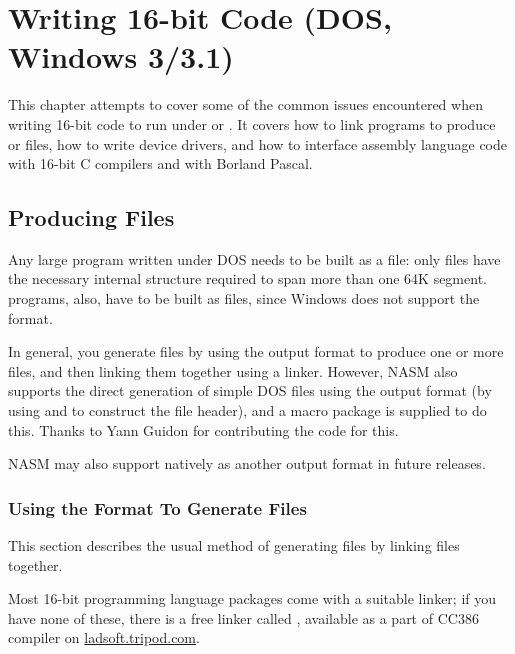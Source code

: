 \chapter{Writing 16-bit Code (DOS, Windows 3/3.1)}
\label{ch:16bit}

This chapter attempts to cover some of the common issues encountered
when writing 16-bit code to run under  or .
It covers how to link programs to produce  or  files,
how to write  device drivers, and how to interface assembly
language code with 16-bit C compilers and with Borland Pascal.

\section{Producing  Files}
\label{sec:exefiles}

Any large program written under DOS needs to be built as a 
file: only  files have the necessary internal structure
required to span more than one 64K segment.  programs,
also, have to be built as  files, since Windows does not
support the  format.

In general, you generate  files by using the  output
format to produce one or more  files, and then linking
them together using a linker. However, NASM also supports the direct
generation of simple DOS  files using the  output
format (by using  and  to construct the  file
header), and a macro package is supplied to do this. Thanks to
Yann Guidon for contributing the code for this.

NASM may also support  natively as another output format in
future releases.

\subsection{Using the  Format To Generate  Files}
\label{subsec:objexe}

This section describes the usual method of generating  files
by linking  files together.

Most 16-bit programming language packages come with a suitable
linker; if you have none of these, there is a free linker called
, available as a part of
CC386 compiler on \href{http://ladsoft.tripod.com/cc386\_compiler.html}
{ladsoft.tripod.com}.

